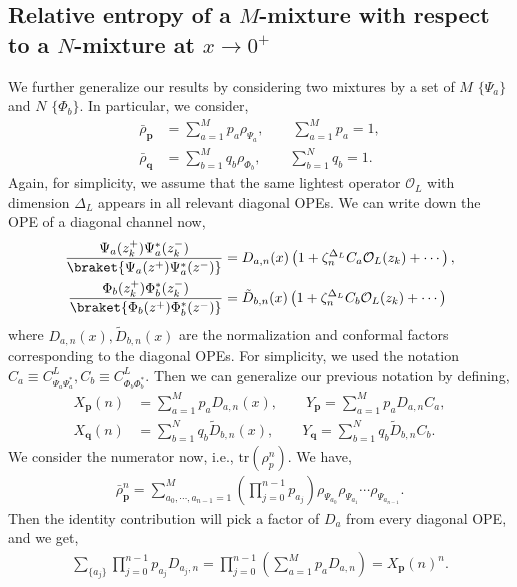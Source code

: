 \documentclass[11pt]{article}
\newcommand{\mO}{\mathcal{O}}
\newcommand{\lb}{\left(}
\newcommand{\rb}{\right)}
\begin{document}
\subsection{
\texorpdfstring{
Relative entropy of a $M$-mixture with respect to a $N$-mixture at $x\to 0^+$
}{
Relative entropy of a M-mixture with respect to a N-mixture at x to 0+
}
}
We further generalize our results by considering two mixtures by a set of $M$ $\{\Psi_a\}$ and $N$ $\{\Phi_b\}$. In particular, we consider,
\begin{align}
    \bar{\rho}_\textbf{p} &= \sum_{a=1}^M p_a \rho_{\Psi_a}, \qquad \sum_{a=1}^M p_a = 1 ,\\
    \bar{\rho}_\textbf{q} &= \sum_{b=1}^M q_b \rho_{\Phi_b}, \qquad \sum_{b=1}^N q_b = 1 .
\end{align}
Again, for simplicity, we assume that the same lightest operator $\mO_L$ with dimension $\Delta_L$ appears in all relevant diagonal OPEs. 
We can write down the OPE of a diagonal channel now,
\begin{align}
    \frac{\Psi_a(z_k^+) \Psi_a^*(z_k^-)} {\braket {\Psi_a(z^+) \Psi_a^*(z^-)}}&= D_{a,n}(x) \lb 1 + \zeta_n^{\Delta_L}C_a\mO_L(z_k) + \cdots\rb,\\
    \frac{\Phi_b(z_k^+) \Phi_b^*(z_k^-)} {\braket {\Phi_b(z^+) \Phi_b^*(z^-)}}&= \tilde{D}_{b,n}(x) \lb 1 + \zeta_n^{\Delta_L}C_b\mO_L(z_k) + \cdots\rb
\end{align}
where $D_{a,n}(x), \tilde{D}_{b,n}(x)$ are the  normalization and conformal factors corresponding to the diagonal OPEs. For simplicity, we used the notation $C_a \equiv C_{\Psi_a\Psi_a^*}^L, C_b \equiv C_{\Phi_b\Phi_b^*}^L$. Then we can generalize our previous notation by defining,
\begin{align}
    X_\textbf{p}(n) &= \sum_{a=1}^Mp_a D_{a,n}(x), \qquad Y_\textbf{p} = \sum_{a=1}^M p_a D_{a,n} C_a,\\
    X_\textbf{q}(n) &= \sum_{b=1}^Nq_b \tilde{D}_{b,n}(x), \qquad Y_\textbf{q} = \sum_{b=1}^N q_b \tilde{D}_{b,n} C_b.
\end{align}
We consider the numerator now, i.e., $\text{tr}(\rho_p^n)$. 
We have,
\begin{align}
    \bar{\rho}_\textbf{p}^n = \sum_{a_0,\cdots, a_{n-1}=1}^M \lb \prod_{j=0}^{n-1}p_{a_j} \rb \rho_{\Psi_{a_0}} \rho_{\Psi_{a_1}} \cdots \rho_{\Psi_{a_{n-1}}}. 
\end{align}
Then the identity contribution will pick a factor of $D_a$ from every diagonal OPE, and we get,
\begin{align}
    \sum_{\{a_j\}} \prod_{j=0}^{n-1}p_{a_j} D_{a_j,n} = \prod_{j=0}^{n-1} \lb \sum_{a=1}^M  p_a D_{a,n}\rb = X_\textbf{p}(n)^n.
\end{align}
\end{document}
